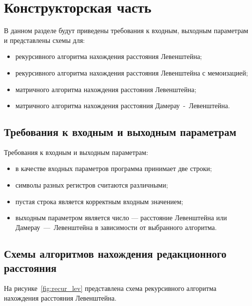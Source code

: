 \section{Конструкторская часть}

В данном разделе будут приведены требования к входным, выходным параметрам и представлены схемы для:
\begin{itemize}
    \item рекурсивного алгоритма нахождения расстояния Левенштейна;
    \item рекурсивного алгоритма нахождения расстояния Левенштейна с мемоизацией;
    \item матричного алгоритма нахождения расстояния Левенштейна;
    \item матричного алгоритма нахождения расстояния Дамерау~-~Левенштейна.
\end{itemize}

\subsection{Требования к входным и выходным параметрам}

Требования к входным и выходным параметрам:
\begin{itemize}
    \item в качестве входных параметров программа принимает две строки;
    \item символы разных регистров считаются различными;
    \item пустая строка является корректным входным значением;
    \item выходным параметром является число --- расстояние Левенштейна или Дамерау~---~Левенштейна в зависимости от выбранного алгоритма.
\end{itemize}

\subsection{Схемы алгоритмов нахождения редакционного расстояния}

На рисунке~\ref{fig:recur_lev} представлена схема рекурсивного алгоритма нахождения расстояния Левенштейна.

